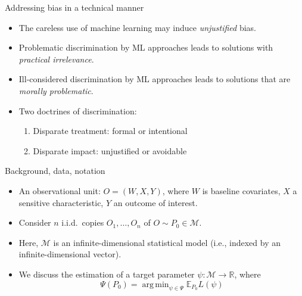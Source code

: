 \documentclass[12pt,t,handout]{beamer}
\newcommand{\E}{\mathbb{E}}
\DeclareMathOperator*{\argmin}{arg\,min}
\begin{document}

\begin{frame}[c]{Addressing bias in a technical manner}

\begin{center}
\begin{itemize}
  \itemsep12pt
  \item The careless use of machine learning may induce \textit{unjustified}
    bias.
  \item Problematic discrimination by ML approaches leads to solutions with
    \textit{practical irrelevance}.
  \item Ill-considered discrimination by ML approaches leads to solutions that
    are \textit{morally problematic}.
  \item Two doctrines of discrimination:
    \begin{enumerate}
      \item Disparate treatment: formal or intentional
      \item Disparate impact: unjustified or avoidable
    \end{enumerate}
\end{itemize}
\end{center}


\end{frame}


\begin{frame}[c]{Background, data, notation}

\begin{center}
\begin{itemize}
  \itemsep12pt
  \item An observational unit: $O = (W, X, Y)$, where $W$ is baseline
    covariates, $X$ a sensitive characteristic, $Y$ an outcome of interest.
  \item Consider $n$ i.i.d.~copies $O_1, \ldots, O_n$ of $O \sim P_0 \in
    \mathcal{M}$.
  \item Here, $\mathcal{M}$ is an infinite-dimensional statistical model (i.e.,
    indexed by an infinite-dimensional vector).
  \item We discuss the estimation of a target parameter $\psi : \mathcal{M}
    \rightarrow \mathbb{R}$, where
    $$\Psi(P_0) = \argmin_{\psi \in \Psi} \E_{P_0}L(\psi)$$
\end{itemize}
\end{center}


\end{frame}
\end{document}
